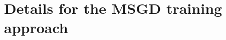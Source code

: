 \documentclass[12pt]{article}
\begin{document}

\section{Details for the MSGD training approach}\label{appen:MSGDtraining}
\end{document}
